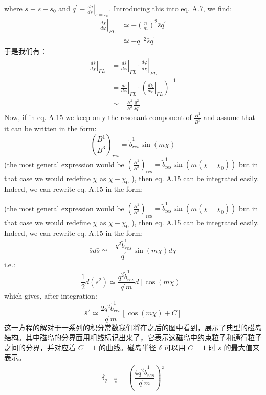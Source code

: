 where $\bar{s} \equiv s-s_{0}$ and $\left.q^{\prime} \equiv \frac{d q}{d s}\right|_{s=s_{0}} .$ Introducing this into eq. A.7, we find:
\[
\begin{aligned}
\left.\frac{d \chi}{d \varphi}\right|_{F L} & \simeq-\left(\frac{n}{m}\right)^{2} \bar{s} q^{\prime} \\
& \simeq-q^{-2} \bar{s} q^{\prime}
\end{aligned}
\]
于是我们有：
\[
\begin{aligned}
\left.\frac{d \bar{s}}{d \chi}\right|_{F L} &=\left.\left.\frac{d \bar{s}}{d \varphi}\right|_{F L} \cdot \frac{d \varphi}{d \chi}\right|_{F L} \\
&=\left.\frac{d s}{d \varphi}\right|_{F L} \cdot\left(\left.\frac{d \chi}{d \varphi}\right|_{F L}\right)^{-1} \\
& \simeq-\frac{B^{1}}{B^{3}} \frac{q^{2}}{s q^{\prime}}
\end{aligned}
\]
Now, if in eq. A.15 we keep only the resonant component of $\frac{B^{1}}{B^{3}}$ and assume that it can be written in the form:
\[
\left(\frac{B^{1}}{B^{3}}\right)_{r e s}=\tilde{b}_{r e s}^{1} \sin (m \chi)
\]
(the most general expression would be $\left(\frac{B^{1}}{B^{3}}\right)_{\text {res}}=\tilde{b}_{\text {res}}^{1} \sin \left(m\left(\chi-\chi_{0}\right)\right)$ but in that case
we would redefine $\chi$ as $\chi-\chi_{0}$ ), then eq. A.15 can be integrated easily. Indeed, we can rewrite eq. A.15 in the form:

(the most general expression would be $\left(\frac{B^{1}}{B^{3}}\right)_{\text {res}}=\tilde{b}_{\text {res}}^{1} \sin \left(m\left(\chi-\chi_{0}\right)\right)$ but in that case
we would redefine $\chi$ as $\chi-\chi_{0}$ ), then eq. A.15 can be integrated easily. Indeed, we can rewrite eq. A.15 in the form:
\[
\bar{s} d \bar{s} \simeq-\frac{q^{2} \tilde{b}_{r e s}^{1}}{q^{\prime}} \sin (m \chi) d \chi
\]
i.e.:
\[
\frac{1}{2} d\left(\bar{s}^{2}\right) \simeq \frac{q^{2} \tilde{b}_{r e s}^{1}}{q^{\prime} m} d[\cos (m \chi)]
\]
which gives, after integration:
\[
\bar{s}^{2} \simeq \frac{2 q^{2} \tilde{b}_{r e s}^{1}}{q^{\prime} m}[\cos (m \chi)+C]
\]
这一方程的解对于一系列的积分常数我们将在之后的图中看到，展示了典型的磁岛结构。其中磁岛的分界面用粗线标记出来了，它表示这磁岛中约束粒子和通行粒子之间的分界，并对应着 $C=1$ 的曲线。磁岛半径 $\delta$ 可以用 $C=1$ 时 $\bar{s}$ 的最大值来表示。
\[
\delta_{q=\frac{m}{n}}=\left(\frac{4 q^{2} \tilde{b}_{r e s}^{1}}{q^{\prime} m}\right)^{\frac{1}{2}}
\]